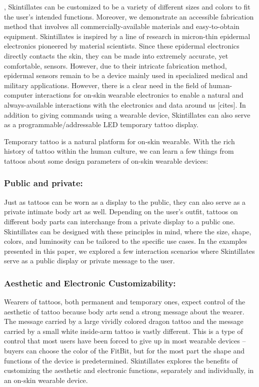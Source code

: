 \documentclass{sigchi}
\begin{document}
, Skintillates can be customized to be a variety of different sizes and colors to fit the user's intended functions. Moreover, we demonstrate an accessible fabrication method that involves %
all commercially-available materials and easy-to-obtain equipment. 
Skintillates is inspired by a line of research in micron-thin epidermal electronics pioneered by material scientists.%
 Since these epidermal electronics directly contacts the skin, they can be made into extremely accurate, yet comfortable, sensors. However, due to their intricate fabrication method, epidermal sensors remain to be a device mainly used in specialized medical and military applications. %
However, there is a clear need in the field of human-computer interactions for on-skin wearable electronics to enable a natural and always-available interactions with the electronics and data around us [cites]. %
In addition to giving commands using a wearable device, Skintillates can also serve as a programmable/addressable LED temporary tattoo display. %

Temporary tattoo is a natural platform for on-skin wearable. With the rich history of tattoo within the human culture, we can learn a few things from tattoos about some design parameters of on-skin wearable devices: 

\subsubsection{Public and private:}
Just as tattoos can be worn as a display to the public, they can also serve as a private intimate body art as well. Depending on the user's outfit, tattoos on different body parts can interchange from a private display to a public one. Skintillates can be designed with these principles in mind, where the size, shape, colors, and luminosity can be tailored to the specific use cases. In the examples presented in this paper, we explored a few interaction scenarios where Skintillates serve as a public display or private message to the user. 
\subsubsection{Aesthetic and Electronic Customizability:}
Wearers of tattoos, both permanent and temporary ones, expect control of the aesthetic of tattoo because body arts send a strong message about the wearer. The message carried by a large vividly colored dragon tattoo and the message carried by a small white inside-arm tattoo is vastly different. This is a type of control that most users have been forced to give up in most wearable devices – buyers can choose the color of the FitBit, but for the most part the shape and functions of the device is predetermined. Skintillates explores the benefits of customizing the aesthetic and electronic functions, separately and individually, in an on-skin wearable device. 
\end{document}
